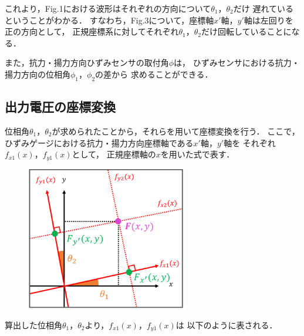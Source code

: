 \documentclass[twocolumn,a4j]{jsarticle}
\begin{document}
これより，Fig.1における波形はそれぞれの方向について$\theta_1$，$\theta_2$だけ
遅れているということがわかる．
すなわち，Fig.3について，座標軸$x'$軸，$y'$軸は左回りを正の方向として，
正規座標系に対してそれぞれ$\theta_1$，$\theta_2$だけ回転していることになる．\par

また，抗力・揚力方向ひずみセンサの取付角$\phi$は，
ひずみセンサにおける抗力・揚力方向の位相角$\phi_1$，$\phi_2$の差から
求めることができる．


\subsection{出力電圧の座標変換}
位相角$\theta_1$，$\theta_2$が求められたことから，それらを用いて座標変換を行う．
ここで，ひずみゲージにおける抗力・揚力方向座標軸である$x'$軸，$y'$軸を
それぞれ$f_{x1}\left(x\right)$，$f_{y1}\left(x\right)$として，
正規座標軸の$x$を用いた式で表す．

\begin{figure}[htbp]
    \footnotesize
    \begin{center}
        \includegraphics[width=70mm]{../images/image_3.png}
        \caption{}
    \end{center}
\end{figure}

算出した位相角$\theta_1$，$\theta_2$より，$f_{x1}\left(x\right)$，$f_{y1}\left(x\right)$は
以下のように表される．
\end{document}
